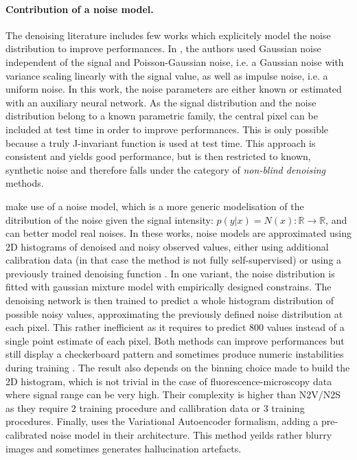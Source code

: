 \documentclass{article}
\begin{document}
\paragraph{Contribution of a noise model.}
The denoising literature includes few works which explicitely model the noise distribution to improve performances. In \cite{laine2019high}, the authors used Gaussian noise independent of the signal and Poisson-Gaussian noise, i.e. a Gaussian noise with variance scaling linearly with the signal value, as well as impulse noise, i.e. a uniform noise.
In this work, the noise parameters are either known or estimated with an auxiliary neural network.
As the signal distribution and the noise distribution belong to a known parametric family, the central pixel can be included at test time in order to improve performances.
This is only possible because a truly J-invariant function is used at test time. This approach is consistent and yields good performance, but is then restricted to known, synthetic noise and therefore falls under the category of \textit{non-blind denoising} methods.

\cite{krull2019probabilistic,prakash2020fully,2020DivNoising} make use of a noise model, which is a more generic modelisation of the ditribution of the noise given the signal intensity: $p(y|x) = N(x): \mathbb{R} \to \mathbb{R}$, and can better model real noises.
In these works, noise models are approximated using 2D histograms of denoised and noisy observed values, either using additional calibration data \cite{krull2019probabilistic} (in that case the method is not fully self-supervised) or using a previously trained denoising function \cite{prakash2020fully}. In one variant, the noise distribution is fitted with gaussian mixture model with empirically designed constrains.
The denoising network is then trained to predict a whole histogram distribution of possible noisy values, approximating the previously defined noise distribution at each pixel.
This rather inefficient as it requires to predict $800$ values instead of a single point estimate of each pixel.
Both methods can improve performances but still display a checkerboard pattern and sometimes produce numeric instabilities during training \cite{goncharova2020}.
The result also depends on the binning choice made to build the 2D histogram, which is not trivial in the case of fluorescence-microscopy data where signal range can be very high.
Their complexity is higher than N2V/N2S as they require $2$ training procedure and callibration data or $3$ training procedures.
Finally, \cite{2020DivNoising} uses the Variational Autoencoder formalism, adding a pre-calibrated noise model in their architecture.
This method yeilds rather blurry images and sometimes generates hallucination artefacts.
\end{document}
